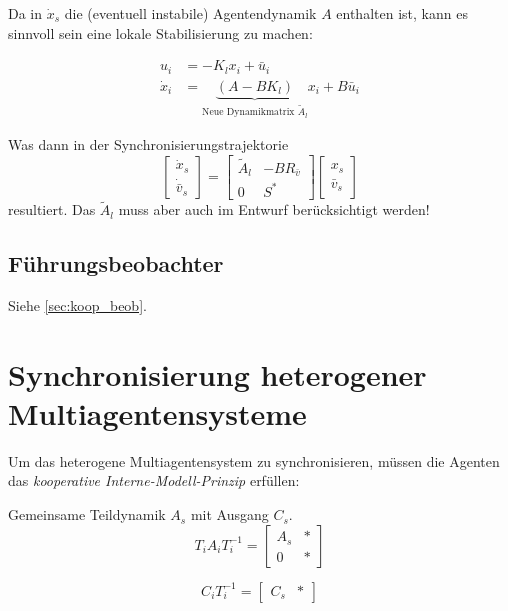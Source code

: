 Da in $\dot{x}_s$ die (eventuell instabile) Agentendynamik $A$ enthalten ist, kann es
sinnvoll sein eine lokale Stabilisierung zu machen:

\begin{align}
    u_i &= -K_l x_i + \bar{u}_i \\
    \dot{x}_i &= \underbrace{(A-BK_l)}_{\text{Neue Dynamikmatrix }\tilde{A}_l}x_i + B\bar{u}_i
\end{align}

Was dann in der Synchronisierungstrajektorie
\begin{equation}
    \begin{bmatrix}
        \dot{x}_s \\ \dot{\bar{v}}_s
    \end{bmatrix}
    =
    \begin{bmatrix}
        \tilde{A}_l & -BR_{\bar{v}} \\
        0 & S^*
    \end{bmatrix}
    \begin{bmatrix}
        x_s \\ \bar{v}_s
    \end{bmatrix}
\end{equation}
resultiert. Das $\tilde{A}_l$ muss aber auch im Entwurf berücksichtigt werden!

\subsection{Führungsbeobachter}
Siehe \ref{sec:koop_beob}.

\pagebreak
\section{Synchronisierung heterogener Multiagentensysteme}

Um das heterogene Multiagentensystem zu synchronisieren, müssen die Agenten das \emph{kooperative Interne-Modell-Prinzip} erfüllen:

Gemeinsame Teildynamik $A_s$ mit Ausgang $C_s$.
\begin{equation}
    T_i A_i T_i^{-1} = \begin{bmatrix}
        A_s & * \\
        0 & *
    \end{bmatrix}
\end{equation}

\begin{equation}
    C_i T_i^{-1} = \begin{bmatrix}
        C_s & *
    \end{bmatrix}
\end{equation}

